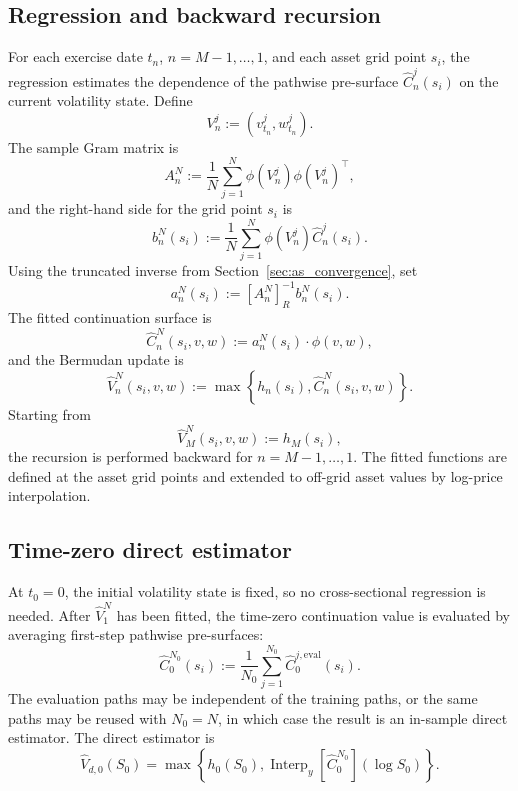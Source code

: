 \documentclass[pdflatex,sn-mathphys-num]{sn-jnl}
\theoremstyle{thmstyleone}%
\theoremstyle{thmstylethree}%
\theoremstyle{thmstyletwo}%
\begin{document}
\subsection{Regression and backward recursion}
For each exercise date $t_n$, $n=M-1,\ldots,1$, and each asset grid point $s_i$,
the regression estimates the dependence of the pathwise pre-surface
$\widehat C_n^j(s_i)$ on the current volatility state. Define
\[
    V_n^j:=(v_{t_n}^j,w_{t_n}^j).
\]
The sample Gram matrix is
\[
    A_n^N
    :=
    \frac1N\sum_{j=1}^N
        \phi(V_n^j)\phi(V_n^j)^\top,
\]
and the right-hand side for the grid point $s_i$ is
\[
    b_n^N(s_i)
    :=
    \frac1N\sum_{j=1}^N
        \phi(V_n^j)\widehat C_n^j(s_i).
\]
Using the truncated inverse from Section~\ref{sec:as_convergence}, set
\begin{equation}
    a_n^N(s_i):=[A_n^N]^{-1}_R b_n^N(s_i).
\label{eq:lsq}
\end{equation}
The fitted continuation surface is
\[
    \widehat C_n^N(s_i,v,w)
    :=
    a_n^N(s_i)\cdot\phi(v,w),
\]
and the Bermudan update is
\[
    \widehat V_n^N(s_i,v,w)
    :=
    \max\left\{
        h_n(s_i),
        \widehat C_n^N(s_i,v,w)
    \right\}.
\]
Starting from
\[
    \widehat V_M^N(s_i,v,w):=h_M(s_i),
\]
the recursion is performed backward for $n=M-1,\ldots,1$. The fitted functions
are defined at the asset grid points and extended to off-grid asset values by
log-price interpolation.

\subsection{Time-zero direct estimator}
At $t_0=0$, the initial volatility state is fixed, so no cross-sectional
regression is needed. After $\widehat V_1^N$ has been fitted, the time-zero
continuation value is evaluated by averaging first-step pathwise pre-surfaces:
\[
    \widehat C_0^{N_0}(s_i)
    :=
    \frac1{N_0}
    \sum_{j=1}^{N_0}
        \widehat C_0^{j,\mathrm{eval}}(s_i).
\]
The evaluation paths may be independent of the training paths, or the same paths
may be reused with $N_0=N$, in which case the result is an in-sample direct
estimator.
The direct estimator is
\[
    \widehat V_{d,0}(S_0)
    =
    \max\left\{
        h_0(S_0),
        \operatorname{Interp}_y\!\left[
            \widehat C_0^{N_0}
        \right](\log S_0)
    \right\}.
\]
\end{document}
